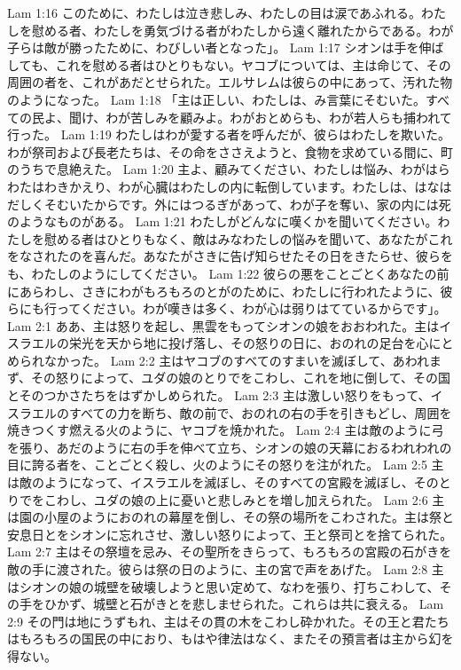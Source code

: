 Lam 1:16  このために、わたしは泣き悲しみ、わたしの目は涙であふれる。わたしを慰める者、わたしを勇気づける者がわたしから遠く離れたからである。わが子らは敵が勝ったために、わびしい者となった」。
Lam 1:17  シオンは手を伸ばしても、これを慰める者はひとりもない。ヤコブについては、主は命じて、その周囲の者を、これがあだとせられた。エルサレムは彼らの中にあって、汚れた物のようになった。
Lam 1:18  「主は正しい、わたしは、み言葉にそむいた。すべての民よ、聞け、わが苦しみを顧みよ。わがおとめらも、わが若人らも捕われて行った。
Lam 1:19  わたしはわが愛する者を呼んだが、彼らはわたしを欺いた。わが祭司および長老たちは、その命をささえようと、食物を求めている間に、町のうちで息絶えた。
Lam 1:20  主よ、顧みてください、わたしは悩み、わがはらわたはわきかえり、わが心臓はわたしの内に転倒しています。わたしは、はなはだしくそむいたからです。外にはつるぎがあって、わが子を奪い、家の内には死のようなものがある。
Lam 1:21  わたしがどんなに嘆くかを聞いてください。わたしを慰める者はひとりもなく、敵はみなわたしの悩みを聞いて、あなたがこれをなされたのを喜んだ。あなたがさきに告げ知らせたその日をきたらせ、彼らをも、わたしのようにしてください。
Lam 1:22  彼らの悪をことごとくあなたの前にあらわし、さきにわがもろもろのとがのために、わたしに行われたように、彼らにも行ってください。わが嘆きは多く、わが心は弱りはてているからです」。
Lam 2:1  ああ、主は怒りを起し、黒雲をもってシオンの娘をおおわれた。主はイスラエルの栄光を天から地に投げ落し、その怒りの日に、おのれの足台を心にとめられなかった。
Lam 2:2  主はヤコブのすべてのすまいを滅ぼして、あわれまず、その怒りによって、ユダの娘のとりでをこわし、これを地に倒して、その国とそのつかさたちをはずかしめられた。
Lam 2:3  主は激しい怒りをもって、イスラエルのすべての力を断ち、敵の前で、おのれの右の手を引きもどし、周囲を焼きつくす燃える火のように、ヤコブを焼かれた。
Lam 2:4  主は敵のように弓を張り、あだのように右の手を伸べて立ち、シオンの娘の天幕におるわれわれの目に誇る者を、ことごとく殺し、火のようにその怒りを注がれた。
Lam 2:5  主は敵のようになって、イスラエルを滅ぼし、そのすべての宮殿を滅ぼし、そのとりでをこわし、ユダの娘の上に憂いと悲しみとを増し加えられた。
Lam 2:6  主は園の小屋のようにおのれの幕屋を倒し、その祭の場所をこわされた。主は祭と安息日とをシオンに忘れさせ、激しい怒りによって、王と祭司とを捨てられた。
Lam 2:7  主はその祭壇を忌み、その聖所をきらって、もろもろの宮殿の石がきを敵の手に渡された。彼らは祭の日のように、主の宮で声をあげた。
Lam 2:8  主はシオンの娘の城壁を破壊しようと思い定めて、なわを張り、打ちこわして、その手をひかず、城壁と石がきとを悲しませられた。これらは共に衰える。
Lam 2:9  その門は地にうずもれ、主はその貫の木をこわし砕かれた。その王と君たちはもろもろの国民の中におり、もはや律法はなく、またその預言者は主から幻を得ない。
